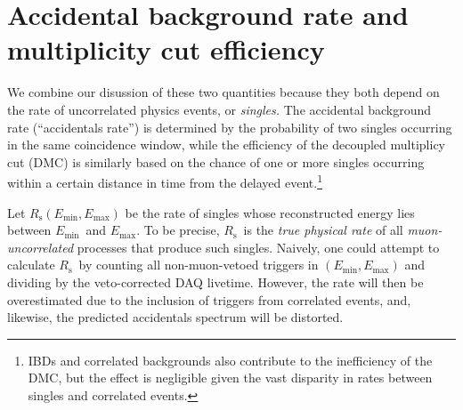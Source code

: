 \documentclass[../thesis.tex]{subfiles}
\begin{document}
\chapter{Accidental background rate and multiplicity cut efficiency}
\label{chap:accDMC}


\def\Emin{\ensuremath{E_\mathrm{min}}} \def\Emax{\ensuremath{E_\mathrm{max}}}
\def\Rs{\ensuremath{R_\mathrm{s}}} \def\Rplu{\ensuremath{R_\mathrm{+}}}
\def\Rpro{\ensuremath{R_\mathrm{p}}} \def\Rdel{\ensuremath{R_\mathrm{d}}}
\def\Rsub{\ensuremath{R_\mathrm{\lambda}}} \def\Nplu{\ensuremath{N_\mathrm{+}}}
\def\Npro{\ensuremath{N_\mathrm{p}}} \def\Ndel{\ensuremath{N_\mathrm{d}}}
\def\eisol{\ensuremath{\epsilon_\mathrm{i}}}
\def\emu{\ensuremath{\epsilon_\mathrm{\mu}}}
\def\etot{\ensuremath{\epsilon_\mathrm{tot}}}
\def\Racc{\ensuremath{R_\mathrm{acc}}}

We combine our disussion of these two quantities because they both depend on the rate of uncorrelated physics events, or \emph{singles.} The accidental background rate (``accidentals rate'') is determined by the probability of two singles occurring in the same coincidence window, while the efficiency of the decoupled multiplicy cut (DMC) is similarly based on the chance of one or more singles occurring within a certain distance in time from the delayed event.\footnote{IBDs and correlated backgrounds also contribute to the inefficiency of the DMC, but the effect is negligible given the vast disparity in rates between singles and correlated events.}

Let $\Rs(\Emin, \Emax)$ be the rate of singles whose reconstructed energy lies
between \Emin\ and \Emax. To be precise, \Rs\ is the \emph{true physical rate}
of all \emph{muon-uncorrelated} processes that produce such singles. Naively,
one could attempt to calculate \Rs\ by counting all non-muon-vetoed triggers in
$(\Emin, \Emax)$ and dividing by the veto-corrected DAQ livetime. However, the
rate will then be overestimated due to the inclusion of triggers from correlated
events, and, likewise, the predicted accidentals spectrum will be distorted.
\end{document}
